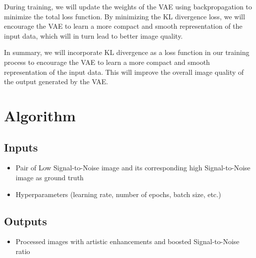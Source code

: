 \documentclass{article}
\begin{document}
During training, we will update the weights of the VAE using backpropagation to minimize the total loss function. By minimizing the KL divergence loss, we will encourage the VAE to learn a more compact and smooth representation of the input data, which will in turn lead to better image quality.

In summary, we will incorporate KL divergence as a loss function in our training process to encourage the VAE to learn a more compact and smooth representation of the input data. This will improve the overall image quality of the output generated by the VAE.

\section{Algorithm}
\subsection{Inputs}

    \begin{itemize}
        \item Pair of Low Signal-to-Noise image and its corresponding high Signal-to-Noise image as ground truth
        \item Hyperparameters (learning rate, number of epochs, batch size, etc.)
    \end{itemize}

\subsection{Outputs}
    \begin{itemize}
        \item Processed images with artistic enhancements and boosted Signal-to-Noise ratio
    \end{itemize}
\end{document}
